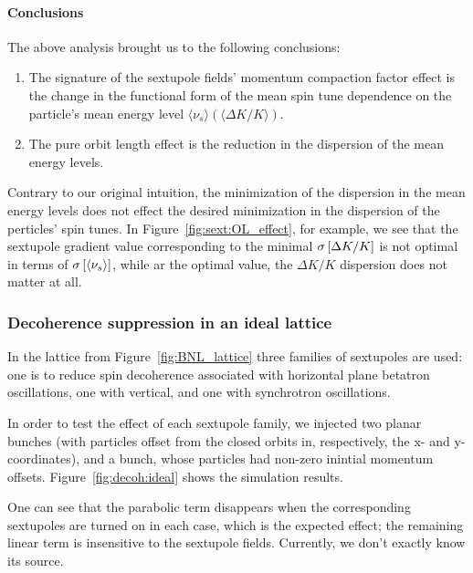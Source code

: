 \documentclass[]{elsarticle}
\newcommand{\D}{\Delta}
\newcommand{\SD}[1]{\sigma\bkt*{#1}}
\newcommand{\avg}[1]{\langle{#1}\rangle}
\begin{document}
\paragraph{Conclusions}
The above analysis brought us to the following conclusions:
\begin{enumerate}[(1)]
\item The signature of the sextupole fields' momentum compaction factor effect is the change in the functional
  form of the mean spin tune dependence on the particle's mean energy level $\avg{\nu_s}(\avg{\D K/K})$.
  \item The pure orbit length effect is the reduction in the dispersion of the mean energy levels.
\end{enumerate}

Contrary to our original intuition, the minimization of the dispersion in the mean energy levels does not
effect the desired minimization in the dispersion of the perticles' spin tunes.
In Figure~\ref{fig:sext:OL_effect}, for example, we see that the sextupole gradient value corresponding to the
minimal $\SD{\D K/K}$ is not optimal in terms of $\SD{\avg{\nu_s}}$, while ar the optimal value,
the $\D K/K$ dispersion does not matter at all.

\subsubsection{Decoherence suppression in an ideal lattice}
In the lattice from Figure~\ref{fig:BNL_lattice} three families of sextupoles are used: one is to reduce spin
decoherence associated with horizontal plane betatron oscillations, one with vertical, and one with synchrotron
oscillations.

In order to test the effect of each sextupole family, we injected two planar bunches
(with particles offset from the closed orbits in, respectively, the x- and y-coordinates), and
a bunch, whose particles had non-zero inintial momentum offsets. Figure~\ref{fig:decoh:ideal}
shows the simulation results.

One can see that the parabolic term disappears when the corresponding sextupoles are turned on in each case,
which is the expected effect; the remaining linear term is insensitive to the sextupole fields. Currently,
we don't exactly know its source.
\end{document}
